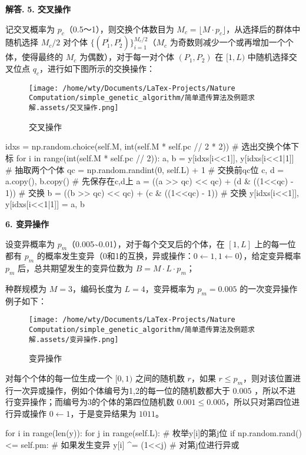 \documentclass[12pt, a4paper, oneside]{ctexart}
\newenvironment{solution}[1][]{\par\noindent\textbf{#1解答. }}{\smallskip\par}  %
\begin{document}
\begin{solution}
\textbf{5. 交叉操作}

记交叉概率为 \(p_c\)（0.5～1），则交换个体数目为
\(M_c = \lfloor M\cdot p_c\rfloor\)，从选择后的群体中随机选择 \(M_c/2\)
对个体 \(\{(P^i_{1},P^i_{2})\}_{i=1}^{M_c/2}\)（\(M_c\)
为奇数则减少一个或再增加一个个体，使得最终的 \(M_c\)
为偶数），对于每一对个体 \((P_1,P_2)\) 在 \([1,L)\) 中随机选择交叉位点
\(q_c\)，进行如下图所示的交换操作：

\begin{figure}[htbp]
\centering
\texttt{[image: /home/wty/Documents/LaTex-Projects/Nature Computation/simple\_genetic\_algorithm/简单遗传算法及例题求解.assets/交叉操作.png]}
\caption{交叉操作}
\end{figure}

\begin{pythoncode}
idxs = np.random.choice(self.M, int(self.M * self.pc // 2 * 2))  # 选出交换个体下标
for i in range(int(self.M * self.pc // 2)):
    a, b = y[idxs[i<<1]], y[idxs[i<<1|1]]  # 抽取两个个体
    qc = np.random.randint(0, self.L) + 1  # 交换前qc位
    c, d = a.copy(), b.copy()  # 先保存在c,d上
    a = ((a >> qc) << qc) + (d & ((1<<qc) - 1))  # 交换
    b = ((b >> qc) << qc) + (c & ((1<<qc) - 1))  # 交换
    y[idxs[i<<1]], y[idxs[i<<1|1]] = a, b
\end{pythoncode}

\textbf{6. 变异操作}

设变异概率为
\(p_m\)（0.005\textasciitilde0.01），对于每个交叉后的个体，在 \([1,L]\)
上的每一位都有 \(p_m\)
的概率发生变异（0和1的互换，异或操作：\(0\gets1,1\gets0\)），给定变异概率
\(p_m\) 后，总共期望发生的变异位数为 \(B = M\cdot L\cdot p_m\)；

种群规模为 \(M=3\)，编码长度为 \(L=4\)，变异概率为 \(p_m=0.005\)
的一次变异操作例子如下：

\begin{figure}[htbp]
\centering
\texttt{[image: /home/wty/Documents/LaTex-Projects/Nature Computation/simple\_genetic\_algorithm/简单遗传算法及例题求解.assets/变异操作.png]}
\caption{变异操作}
\end{figure}
对每个个体的每一位生成一个 \([0,1)\) 之间的随机数 \(r\)，如果
\(r \leqslant p_m\)，则对该位置进行一次异或操作，例如个体编号为1,2的每一位的随机数都大于
\(0.005\) ，所以不进行变异操作；而编号为3的个体的第四位随机数
\(0.001 \leqslant 0.005\)，所以只对第四位进行异或操作
\(0\gets 1\)，于是变异结果为 \(1011\)。

\begin{pythoncode}
for i in range(len(y)):
    for j in range(self.L):  # 枚举y[i]的第j位
        if np.random.rand() <= self.pm:  # 如果发生变异
            y[i] ^= (1<<j)  # 对第j位进行异或    
\end{pythoncode}



\end{solution}
\end{document}

